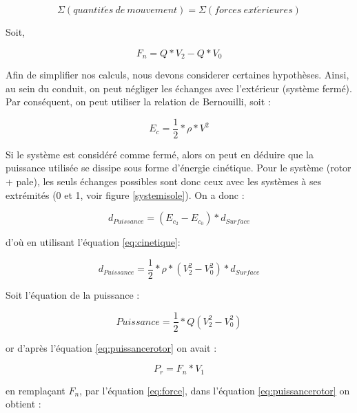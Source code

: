 \documentclass[a4paper,10pt]{report}
\begin{document}
	\begin{equation}
	  \label{eq:quantitemouvement}
	  \Sigma(quantit\acute{e}s \ de \ mouvement) = \Sigma (forces \ 
ext\acute{e}rieures) 
	\end{equation}
	
	Soit,
	
	\begin{equation}
	  \label{eq:force}
	  F_{n} = Q * V_{2} - Q * V_{0} 
	\end{equation}
	
	Afin de simplifier nos calculs, nous devons considerer certaines 
hypothèses. Ainsi, au sein du conduit, on peut négliger les échanges avec 
l'extérieur (système fermé). Par conséquent, on peut utiliser la relation de 
Bernouilli, soit :

	\begin{equation}
	  \label{eq:cinetique}
	  E_{c} = \frac{1}{2} * \rho * V^{2} 
	\end{equation}
	
	Si le système est considéré comme fermé, alors on peut en déduire que la 
puissance utilisée se dissipe sous forme d'énergie cinétique. Pour le système 
(rotor + pale), les seuls échanges possibles sont donc ceux avec les systèmes à 
ses extrémités ({0} et {1}, voir figure \ref{systemisole}). On a donc :

	\begin{equation}
	  d_{Puissance} = (E_{c_{2}} - E_{c_{0}}) * d_{Surface}
	\end{equation}

	d'où en utilisant l'équation \ref{eq:cinetique}:
	
	\begin{equation}
	  d_{Puissance} = \frac{1}{2} * \rho * (V_{2}^{2} - V_{0}^{2}) * 
d_{Surface}
	\end{equation}
	
	Soit l'équation de la puissance :
	
	\begin{equation}
	  \label{eq:puissance}
	  Puissance = \frac{1}{2} * Q(V_{2}^{2}-V_{0}^{2}) 
	\end{equation}
	
	or d'après l'équation \ref{eq:puissancerotor} on avait :
	
	\begin{equation}
	  \label{eq:puissance1}
	  P_{r} = F_{n} * V_{1}
	\end{equation}
	
	en remplaçant $F_{n}$, par l'équation \ref{eq:force}, dans 
l'équation \ref{eq:puissancerotor} on obtient : 
	
\end{document}
